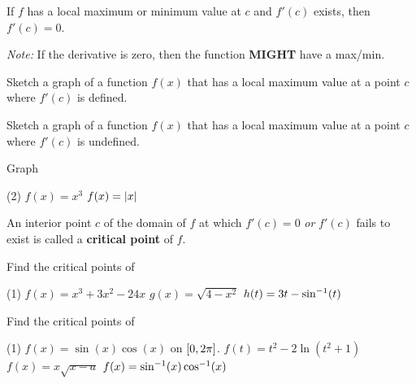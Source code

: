 \documentclass[mathNotesPreamble]{subfiles}
\begin{document}
\begin{thmBox*}
  If $f$ has a local maximum or minimum value at $c$ and $f'(c)$ exists, then $f'(c)=0$.
\end{thmBox*}

\begin{center}
  \textit{Note:} If the derivative is zero, then the function \textbf{MIGHT} have a max/min.  
\end{center}

\begin{ex*}
  Sketch a graph of a function $f(x)$ that has a local maximum value at a point $c$ where $f'(c)$ is defined.
\end{ex*}
\begin{ex*}
  Sketch a graph of a function $f(x)$ that has a local maximum value at a point $c$ where $f'(c)$ is undefined.
\end{ex*}
\begin{ex*}
  Graph 
  \begin{tasks}(2)
    \task $f(x)=x^3$
    \task $f(x)={\left\vert x\right\vert}$
  \end{tasks}
\end{ex*}
\pagebreak
\begin{defn*}
  An interior point $c$ of the domain of $f$ at which $f'(c)=0$ \textit{or} $f'(c)$ fails to exist is called a \textbf{critical point} of $f$.
\end{defn*}
\begin{ex*}
  Find the critical points of
\end{ex*}
\begin{tasks}[after-item-skip=\stretch{1}, label=~](1)
  \task $f(x)=x^3+3x^2-24x$
  \task $g(x)=\sqrt{4-x^2}$
  \task $h(t)=3t-\sin^{-1}(t)$
\end{tasks}
\pagebreak
\begin{ex*}
  Find the critical points of
\end{ex*}
\begin{tasks}[after-item-skip=\stretch{1}, label=~](1)
  \task $f(x)=\sin(x)\cos(x)$ on ${\left[0,2\pi\right]}$. 
  \task $f(t)=t^2-2\ln(t^2+1)$
  \task $f(x)=x\sqrt{x-a}$
  \task $f(x)=\sin^{-1}(x)\cos^{-1}(x)$
\end{tasks}
\end{document}
